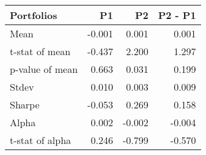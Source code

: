 \begin{tabular}{lrrr}
\toprule
Portfolios & P1 & P2 & P2 - P1 \\
\midrule
Mean & -0.001 & 0.001 & 0.001 \\
t-stat of mean & -0.437 & 2.200 & 1.297 \\
p-value of mean & 0.663 & 0.031 & 0.199 \\
Stdev & 0.010 & 0.003 & 0.009 \\
Sharpe & -0.053 & 0.269 & 0.158 \\
Alpha & 0.002 & -0.002 & -0.004 \\
t-stat of alpha & 0.246 & -0.799 & -0.570 \\
\bottomrule
\end{tabular}
